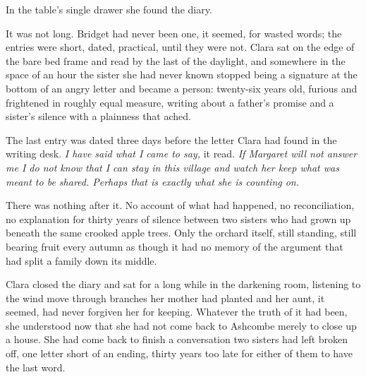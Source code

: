 \documentclass[10pt,twoside]{memoir}
\begin{document}
In the table's single drawer she found the diary.

It was not long. Bridget had never been one, it seemed, for wasted words;
the entries were short, dated, practical, until they were not. Clara sat
on the edge of the bare bed frame and read by the last of the daylight,
and somewhere in the space of an hour the sister she had never known
stopped being a signature at the bottom of an angry letter and became a
person: twenty-six years old, furious and frightened in roughly equal
measure, writing about a father's promise and a sister's silence with a
plainness that ached.

The last entry was dated three days before the letter Clara had found in
the writing desk. \emph{I have said what I came to say,} it read. \emph{If
Margaret will not answer me I do not know that I can stay in this village
and watch her keep what was meant to be shared. Perhaps that is exactly
what she is counting on.}

There was nothing after it. No account of what had happened, no
reconciliation, no explanation for thirty years of silence between two
sisters who had grown up beneath the same crooked apple trees. Only the
orchard itself, still standing, still bearing fruit every autumn as
though it had no memory of the argument that had split a family down its
middle.

Clara closed the diary and sat for a long while in the darkening room,
listening to the wind move through branches her mother had planted and
her aunt, it seemed, had never forgiven her for keeping. Whatever the
truth of it had been, she understood now that she had not come back to
Ashcombe merely to close up a house. She had come back to finish a
conversation two sisters had left broken off, one letter short of an
ending, thirty years too late for either of them to have the last word.
\end{document}
